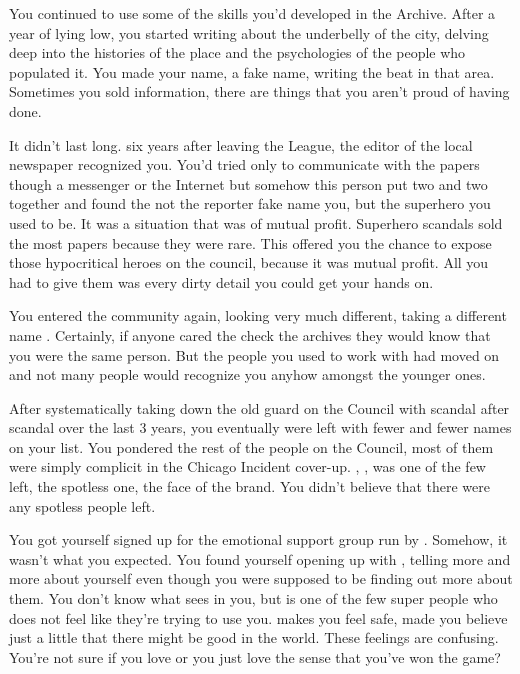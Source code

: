 \documentclass[char]{LRSguildcamp1}
\begin{document}
You continued to use some of the skills you'd developed in the Archive. After a year of lying low, you started writing about the underbelly of the city, delving deep into the histories of the place and the psychologies of the people who populated it. You made your name, a fake name, writing the beat in that area. Sometimes you sold information, there are things that you aren't proud of having done. 

It didn't last long. six years after leaving the League, the editor of the local newspaper recognized you. You'd tried only to communicate with the papers though a messenger or the Internet but somehow this person put two and two together and found the not the reporter fake name you, but the superhero you used to be. It was a situation that was of mutual profit. Superhero scandals sold the most papers because they were rare. This offered you the chance to expose those hypocritical heroes on the council, because it was mutual profit. All you had to give them was every dirty detail you could get your hands on. 

You entered the community again, looking very much different, taking a different name \cYS{\MYsupername}. Certainly, if anyone cared the check the archives they would know that you were the same person. But the people you used to work with had moved on and not many people would recognize you anyhow amongst the younger ones.  

After systematically taking down the old guard on the Council with scandal after scandal over the last 3 years, you eventually were left with fewer and fewer names on your list. You pondered the rest of the people on the Council, most of them were simply complicit in the Chicago Incident cover-up. \cYoungest{\MYsupername}, \cYoungest{}, was one of the few left, the spotless one, the face of the brand. You didn't believe that there were any spotless people left. 
 
You got yourself signed up for the emotional support group run by \cYoungest{\them}. Somehow, it wasn't what you expected. You found yourself opening up with \cYoungest{\them}, telling \cYoungest{\them} more and more about yourself even though you were supposed to be finding out more about them. You don't know what \cYoungest{\they} sees in you, but \cYoungest{\they} is one of the few super people who does not feel like they're trying to use you. \cYoungest{\intro} makes you feel safe, made you believe just a little that there might be good in the world. These feelings are confusing. You're not sure if you love \cYoungest{\intro} or you just love the sense that you've won the game?
\end{document}
